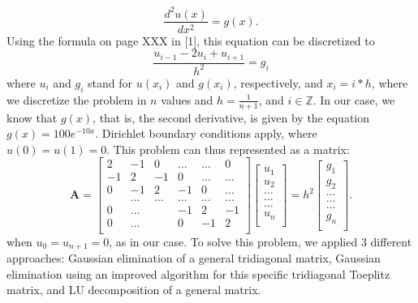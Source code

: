\documentclass[10pt,a4paper]{article}
\begin{document}
\begin{equation*}
\frac{d^2u(x)}{dx^2} = g(x).

\end{equation*}
Using the formula on page XXX in [1], this equation can be discretized to 
\begin{equation*}
\frac{u_{i-1}-2u_{i}+u_{i+1}}{h^2} = g_{i}
\end{equation*}
where $u_{i}$ and $g_{i}$ stand for $u(x_{i})$ and $g(x_{i})$, respectively, and $x_{i}=i*h$, where we discretize the problem in $n$ values and  $h=\frac{1}{n+1}$, and $i  \in  \mathbb{Z}$.
In our case, we know that $g(x)$, that is, the second derivative, is given by the equation $g(x) = 100e^{-10x}$. Dirichlet boundary conditions apply, where $u(0)=u(1)=0$.
This problem can thus represented as a matrix:
\[
    \mathbf{A} = \begin{bmatrix}
                           2& -1& 0 &\dots   & \dots &0 \\
                           -1 & 2 & -1 &0 &\dots &\dots \\
                           0&-1 &2 & -1 & 0 & \dots \\
                           & \dots   & \dots &\dots   &\dots & \dots \\
                           0&\dots   &  &-1 &2& -1 \\
                           0&\dots    &  & 0  &-1 & 2 \\
                      \end{bmatrix}\begin{bmatrix}
                           u_1\\
                           u_2\\
                           \dots \\
                          \dots  \\
                          \dots \\
                           u_n\\
                      \end{bmatrix}
  =h^2
\begin{bmatrix}
                           {g}_1\\
                           {g}_2\\
                           \dots \\
                           \dots \\
                          \dots \\
                           {g}_n\\
                      \end{bmatrix}.
\]
when $u_{0}=u_{n+1}=0$, as in our case.
To solve this problem, we applied 3 different approaches: Gaussian elimination of a general tridiagonal matrix, Gaussian elimination using an improved algorithm for this specific tridiagonal Toeplitz matrix, and LU decomposition of a general matrix.
\end{document}
